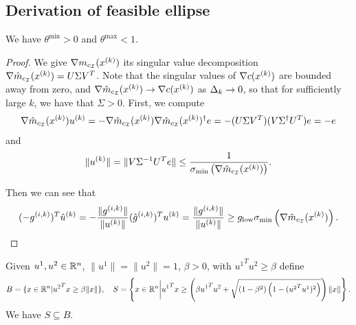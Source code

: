 
\subsection{Derivation of feasible ellipse}


\begin{theorem}
We have $\theta^{\text{min}} > 0$ and $\theta^{\text{max}} < 1$.
\end{theorem}

\begin{proof}
We give $\nabla m_{c_{\mathcal I} }({x^{(k)}})$ its singular value decomposition $\nabla \hat m_{c_{\mathcal I} }({x^{(k)}}) = U\Sigma V^T$.
Note that the singular values of $\nabla c({x^{(k)}})$ are bounded away from zero, and $ \nabla \hat m_{c_{\mathcal I} }({x^{(k)}}) \to \nabla c({x^{(k)}})$ as $\Delta_k\to 0$,
so that for sufficiently large $k$, we have that $\Sigma > 0$.
First, we compute
\begin{align*}
\nabla \hat m_{c_{\mathcal I} }({x^{(k)}}) {u^{(k)}} = -\nabla\hat m_{c_{\mathcal I} }({x^{(k)}}) \nabla\hat m_{c_{\mathcal I} }({x^{(k)}})^{\dagger} e
= -(U\Sigma V^T)(V\Sigma^{\dagger} U^T)e
= -e 
\end{align*}
and
\begin{align*}
\|{u^{(k)}}\| = \|V\Sigma^{-1} U^Te\|  
\le \frac 1 {\sigma_{\text{min}}\left(\nabla \hat m_{c_{\mathcal I}}({x^{(k)}})\right)}.
\end{align*}

Then we can see that
\begin{align*}
(-{g^{(i, k)}})^T{{\hat u}^{(k)}} = -\frac{\|{g^{(i, k)}}\|}{\|{u^{(k)}}\|}({{\hat g}^{(i, k)}})^T{u^{(k)}} = \frac{\|{g^{(i, k)}}\|}{\|{u^{(k)}}\|} \ge g_{\text{low}} \sigma_{\text{min}}\left(\nabla \hat m_{c_{\mathcal I}}({x^{(k)}})\right). \\
\end{align*}



\end{proof}




\begin{theorem}
\label{cone_subset_cone}
Given $u^1, u^2 \in {\mathbb R^{n}}$, $\|u^1\| = \|u^2\|= 1$, $\beta >0$, with ${u^1}^Tu^2 \ge \beta$ define
\begin{align*}
B = \{x\in{\mathbb R^{n}} | {u^2}^Tx \ge \beta\|x\|\}, \quad
S = \left\{x\in{\mathbb R^{n}} \bigg| {u^1}^Tx \ge \left(\beta {u^1}^Tu^2 + \sqrt{(1 - \beta^2)\left(1 - ({u^2}^Tu^1)^2\right)}\right)\|x\| \right\}. 
\end{align*}
We have $S \subseteq B$.
\end{theorem}


